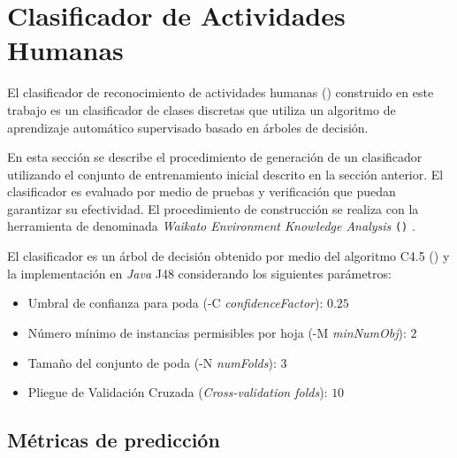 \section{Clasificador de Actividades Humanas}

\label{sec6:clasificacion}El clasificador de reconocimiento de actividades
humanas () construido en este trabajo es un clasificador
de clases discretas que utiliza un algoritmo de aprendizaje automático
supervisado basado en árboles de decisión. 

En esta sección se describe el procedimiento de generación de un clasificador
 utilizando el conjunto de entrenamiento inicial descrito
en la sección anterior. El clasificador es evaluado por medio de pruebas
y verificación que puedan garantizar su efectividad. El procedimiento
de construcción se realiza con la herramienta de  denominada
\emph{Waikato Environment Knowledge Analysis} \texttt{()}
\cite{Frank2016}.

El clasificador es un árbol de decisión obtenido por medio del algoritmo
C4.5 () y la implementación en \emph{Java} J48 \cite{Frank2016b}
considerando los siguientes parámetros:
\begin{itemize}
\item Umbral de confianza para poda\emph{ }(-C\emph{ confidenceFactor}):
$0.25$
\item Número mínimo de instancias permisibles por hoja\emph{ }(-M\emph{
minNumObj}): $2$
\item Tamaño del conjunto de poda\emph{ }(-N\emph{ numFolds}): $3$
\item Pliegue de Validación Cruzada\emph{ }(\emph{Cross-validation folds}):
$10$
\end{itemize}

\subsection{Métricas de predicción }

